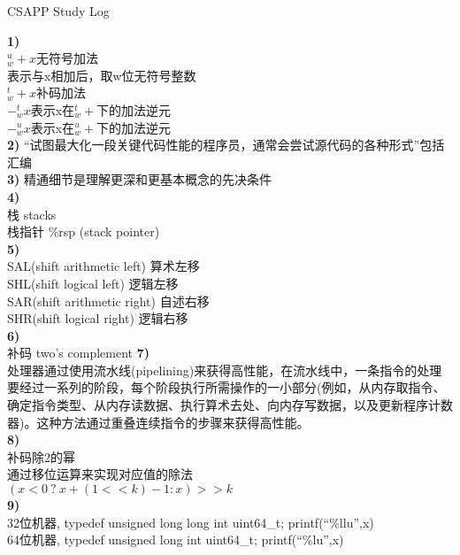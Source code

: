 \documentclass{article}
\begin{document}
\begin{CJK}{UTF8}{gkai}
\end{CJK}
\begin{CJK}{UTF8}{gbsn}
\end{CJK}
\begin{CJK}{UTF8}{uyhei}
\fontsize{40pt}{40pt}\selectfont
\centerline{CSAPP Study Log}		
\fontsize{18pt}{18pt}\selectfont
\noindent\textbf{1)}			\\
$_w^u+x$无符号加法			\\[0.5ex]
表示与x相加后，取w位无符号整数		\\[0.5ex]
$_w^t+x$补码加法			\\[0.5ex]
$-_w^tx$表示x在$^t_w+$下的加法逆元	\\[0.5ex]
$-_w^ux$表示x在$_w^u+$下的加法逆元	\\[1ex]
\textbf{2)}
``试图最大化一段关键代码性能的程序员，通常会尝试源代码的各种形式''包括汇编	\\[1ex]
\textbf{3)}
精通细节是理解更深和更基本概念的先决条件	\\[1ex]
\textbf{4)}	\\
栈	stacks	\\[1ex]
栈指针	\%rsp	(stack pointer)	\\[1ex]
\textbf{5)}	\\
SAL(shift arithmetic left)	算术左移	\\
SHL(shift logical left)		逻辑左移	\\
SAR(shift arithmetic right)	自述右移	\\
SHR(shift logical right)	逻辑右移	\\[1ex]
\textbf{6)}	\\
补码	two's complement
\textbf{7)}	\\
处理器通过使用流水线(pipelining)来获得高性能，在流水线中，一条指令的处理要经过一系列的阶段，每个阶段执行所需操作的一小部分(例如，从内存取指令、确定指令类型、从内存读数据、执行算术去处、向内存写数据，以及更新程序计数器)。这种方法通过重叠连续指令的步骤来获得高性能。	\\[1ex]
\textbf{8)}	\\
补码除2的幂	\\
通过移位运算来实现对应值的除法	\\
$(x<0\ ?\ x+(1<<k)-1 : x) >> k$	\\[1ex]
\newpage
\noindent\textbf{9)}	\\
32位机器, typedef unsigned long long int uint64\_t; printf(``\%llu'',x)	\\
64位机器, typedef unsigned long int uint64\_t; printf(``\%lu'',x)	\\





\end{CJK}
\end{document}
